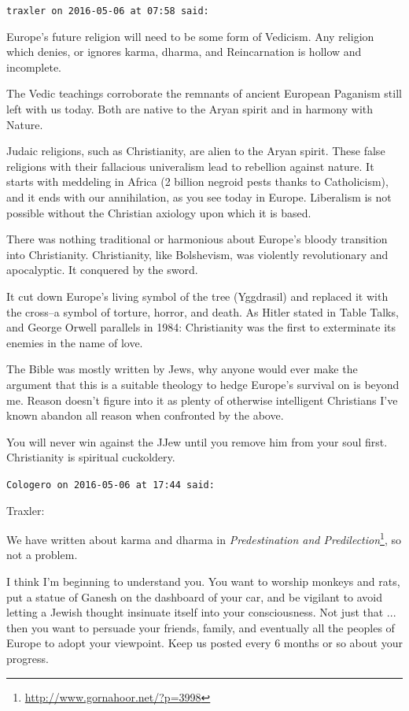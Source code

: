 \begin{footnotesize}
\begin{sffamily}
\hfill

\texttt{traxler on 2016-05-06 at 07:58 said:}

Europe's future religion will need to be some form of Vedicism. Any religion which denies, or ignores karma, dharma, and Reincarnation is hollow and incomplete.

The Vedic teachings corroborate the remnants of ancient European Paganism still left with us today. Both are native to the Aryan spirit and in harmony with Nature.

Judaic religions, such as Christianity, are alien to the Aryan spirit. These false religions with their fallacious univeralism lead to rebellion against nature. It starts with meddeling in Africa (2 billion negroid pests thanks to Catholicism), and it ends with our annihilation, as you see today in Europe. Liberalism is not possible without the Christian axiology upon which it is based.

There was nothing traditional or harmonious about Europe's bloody transition into Christianity. Christianity, like Bolshevism, was violently revolutionary and apocalyptic. It conquered by the sword.

It cut down Europe's living symbol of the tree (Yggdrasil) and replaced it with the cross--a symbol of torture, horror, and death. As Hitler stated in Table Talks, and George Orwell parallels in 1984: Christianity was the first to exterminate its enemies in the name of love.

The Bible was mostly written by Jews, why anyone would ever make the argument that this is a suitable theology to hedge Europe's survival on is beyond me. Reason doesn't figure into it as plenty of otherwise intelligent Christians I've known abandon all reason when confronted by the above.

You will never win against the JJew until you remove him from your soul first. Christianity is spiritual cuckoldery.

\hfill

\texttt{Cologero on 2016-05-06 at 17:44 said:}

Traxler:

We have written about karma and dharma in \textit{Predestination and Predilection}\footnote{\url{http://www.gornahoor.net/?p=3998}}, so not a problem.

I think I'm beginning to understand you. You want to worship monkeys and rats, put a statue of Ganesh on the dashboard of your car, and be vigilant to avoid letting a Jewish thought insinuate itself into your consciousness. Not just that ... then you want to persuade your friends, family, and eventually all the peoples of Europe to adopt your viewpoint. Keep us posted every 6 months or so about your progress.


\end{sffamily}
\end{footnotesize}
